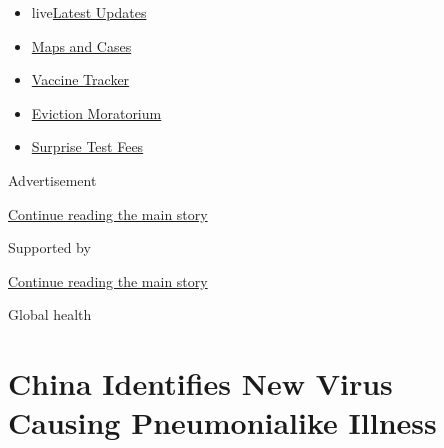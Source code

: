 \begin{itemize}
\tightlist
\item
  live\href{https://www.nytimes3xbfgragh.onion/2020/09/09/world/covid-coronavirus.html?name=styln-coronavirus-national\&region=TOP_BANNER\&block=storyline_menu_recirc\&action=click\&pgtype=Article\&impression_id=e61df751-f2d9-11ea-b16d-01616827df08\&variant=undefined}{Latest
  Updates}
\item
  \href{https://www.nytimes3xbfgragh.onion/interactive/2020/us/coronavirus-us-cases.html?name=styln-coronavirus-national\&region=TOP_BANNER\&block=storyline_menu_recirc\&action=click\&pgtype=Article\&impression_id=e61df752-f2d9-11ea-b16d-01616827df08\&variant=undefined}{Maps
  and Cases}
\item
  \href{https://www.nytimes3xbfgragh.onion/interactive/2020/science/coronavirus-vaccine-tracker.html?name=styln-coronavirus-national\&region=TOP_BANNER\&block=storyline_menu_recirc\&action=click\&pgtype=Article\&impression_id=e61df753-f2d9-11ea-b16d-01616827df08\&variant=undefined}{Vaccine
  Tracker}
\item
  \href{https://www.nytimes3xbfgragh.onion/2020/09/02/your-money/eviction-moratorium-covid.html?name=styln-coronavirus-national\&region=TOP_BANNER\&block=storyline_menu_recirc\&action=click\&pgtype=Article\&impression_id=e61df754-f2d9-11ea-b16d-01616827df08\&variant=undefined}{Eviction
  Moratorium}
\item
  \href{https://www.nytimes3xbfgragh.onion/2020/09/09/upshot/coronavirus-surprise-test-fees.html?name=styln-coronavirus-national\&region=TOP_BANNER\&block=storyline_menu_recirc\&action=click\&pgtype=Article\&impression_id=e61df755-f2d9-11ea-b16d-01616827df08\&variant=undefined}{Surprise
  Test Fees}
\end{itemize}

Advertisement

\protect\hyperlink{after-top}{Continue reading the main story}

Supported by

\protect\hyperlink{after-sponsor}{Continue reading the main story}

Global health

\hypertarget{china-identifies-new-virus-causing-pneumonialike-illness}{%
\section{China Identifies New Virus Causing Pneumonialike
Illness}\label{china-identifies-new-virus-causing-pneumonialike-illness}}

